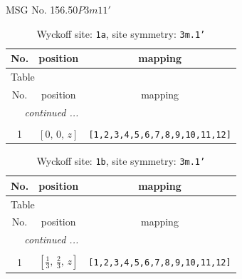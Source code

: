 \documentclass[fleqn,8pt]{jsarticle}
\begin{document}
\setcounter{MaxMatrixCols}{32}

\renewcommand{\tablename}{Table~}
\renewcommand{\figurename}{Figure~}
\begin{center}
\LARGE
MSG No. 156.50\quad$P3m11'$
\end{center}
\renewcommand{\arraystretch}{1.2}
\begin{longtable}{ccc}
\caption{Wyckoff site: {\tt 1a}, site symmetry: {\tt 3m.1'}}
 \\
 \hline \hline
No. & position & mapping \\ \hline \endfirsthead

\multicolumn{2}{l}{\tablename\ \thetable{}} \\
 \hline \hline
No. & position & mapping \\ \hline \endhead

 \hline \hline
\multicolumn{2}{r}{\footnotesize\it continued ...} \\ \endfoot

 \hline \hline
\multicolumn{2}{r}{} \\ \endlastfoot

1 & $\left[ 0,\, 0,\, z \right]$ & {\tt [1,2,3,4,5,6,7,8,9,10,11,12]} \\
\end{longtable}
\renewcommand{\arraystretch}{1.2}
\begin{longtable}{ccc}
\caption{Wyckoff site: {\tt 1b}, site symmetry: {\tt 3m.1'}}
 \\
 \hline \hline
No. & position & mapping \\ \hline \endfirsthead

\multicolumn{2}{l}{\tablename\ \thetable{}} \\
 \hline \hline
No. & position & mapping \\ \hline \endhead

 \hline \hline
\multicolumn{2}{r}{\footnotesize\it continued ...} \\ \endfoot

 \hline \hline
\multicolumn{2}{r}{} \\ \endlastfoot

1 & $\left[ \frac{1}{3},\, \frac{2}{3},\, z \right]$ & {\tt [1,2,3,4,5,6,7,8,9,10,11,12]} \\
\end{longtable}
\renewcommand{\arraystretch}{1.2}
\end{document}
